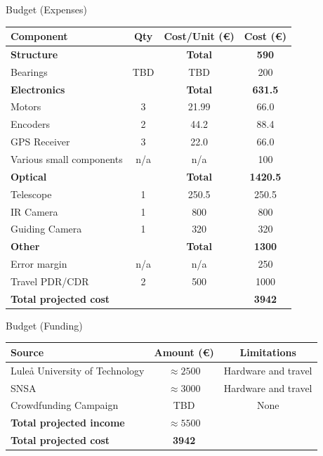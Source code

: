 \documentclass[11pt, aspectratio=169]{beamer}
\begin{document}
\begin{frame}[c]{Budget (Expenses)}
    \centering
    \footnotesize
    \begin{tabular}{|l|c|c|c|} 
        \hline
        Component & Qty & Cost/Unit (\euro) & Cost (\euro)  \\ 
        \hline
        \rowcolor{Gray}
        \textbf{Structure} &  & \textbf{Total} & \textbf{590}  \\
        Bearings & TBD & TBD & 200 \\ 
        \hline
        \rowcolor{Gray}
        \textbf{Electronics} &  & \textbf{Total} & \textbf{631.5}  \\
        Motors & 3 & 21.99 & 66.0  \\
        Encoders & 2 & 44.2 & 88.4  \\
        GPS Receiver & 3 & 22.0 & 66.0  \\
        Various small components & n/a & n/a & 100  \\
        \hline
        
        \rowcolor{Gray}
        \textbf{Optical} &  & \textbf{Total} & \textbf{1420.5}  \\
        Telescope & 1 & 250.5 & 250.5  \\
        IR Camera & 1 & 800 & 800  \\
        Guiding Camera & 1 & 320 & 320  \\
        \hline
        
        \rowcolor{Gray}
        \textbf{Other} &  & \textbf{Total} & \textbf{1300}  \\
        Error margin & n/a & n/a & 250  \\
        Travel PDR/CDR & 2 & 500 & 1000 \\
        \hline
        \textbf{Total projected cost} &  &  & \textbf{3942}  \\
        \hline
    \end{tabular}
\end{frame}

\begin{frame}[c]{Budget (Funding)}
    \centering
    \small
    \begin{tabular}{|l|c|c|} 
        \hline
        Source & Amount (\euro) & Limitations   \\ 
        \hline
        Luleå University of Technology & $\approx2500$ & Hardware and travel \\
        SNSA & $\approx3000$ & Hardware and travel \\
        Crowdfunding Campaign & TBD & None \\
        \hline
        \textbf{Total projected income} & \textbf{$\approx5500$} & \\
        \hline
        \bf{Total projected cost} & \bf{3942} & \\
        \hline
    \end{tabular}
\end{frame}
    
\end{document}
